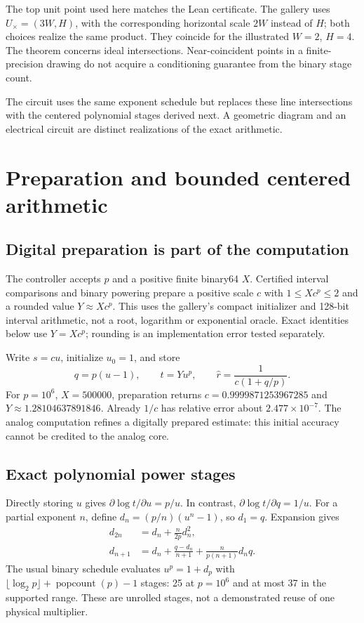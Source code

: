 \documentclass[11pt,a4paper]{article}
\begin{document}
The top unit point used here matches the Lean certificate. The gallery uses $U_\times=(3W,H)$, with the corresponding horizontal scale $2W$ instead of $H$; both choices realize the same product. They coincide for the illustrated $W=2$, $H=4$. The theorem concerns ideal intersections. Near-coincident points in a finite-precision drawing do not acquire a conditioning guarantee from the binary stage count.

The circuit uses the same exponent schedule but replaces these line intersections with the centered polynomial stages derived next. A geometric diagram and an electrical circuit are distinct realizations of the exact arithmetic.
\clearpage
\section{Preparation and bounded centered arithmetic}
\subsection{Digital preparation is part of the computation}
The controller accepts $p$ and a positive finite binary64 $X$. Certified interval comparisons and binary powering prepare a positive scale $c$ with $1\le Xc^p\le2$ and a rounded value $Y\approx Xc^p$. This uses the gallery's compact initializer and 128-bit interval arithmetic, not a root, logarithm or exponential oracle. Exact identities below use $Y=Xc^p$; rounding is an implementation error tested separately.

Write $s=cu$, initialize $u_0=1$, and store
\begin{equation}
 q=p(u-1),\qquad t=Yu^p,\qquad \widehat r=\frac{1}{c(1+q/p)}.\label{eq:state}
\end{equation}
For $p=10^6$, $X=500000$, preparation returns $c=0.9999871253967285$ and $Y\approx1.28104637891846$. Already $1/c$ has relative error about $2.477\times10^{-7}$. The analog computation refines a digitally prepared estimate: this initial accuracy cannot be credited to the analog core.

\subsection{Exact polynomial power stages}
Directly storing $u$ gives $\partial\log t/\partial u=p/u$. In contrast, $\partial\log t/\partial q=1/u$. For a partial exponent $n$, define $d_n=(p/n)(u^n-1)$, so $d_1=q$. Expansion gives
\begin{align}
 d_{2n}&=d_n+\frac{n}{2p}d_n^2,\label{eq:square}\\
 d_{n+1}&=d_n+\frac{q-d_n}{n+1}+\frac{n}{p(n+1)}d_nq.\label{eq:multiply}
\end{align}
The usual binary schedule evaluates $u^p=1+d_p$ with
$\lfloor\log_2p\rfloor+\operatorname{popcount}(p)-1$ stages: 25 at $p=10^6$ and at most 37 in the supported range. These are unrolled stages, not a demonstrated reuse of one physical multiplier.
\end{document}
